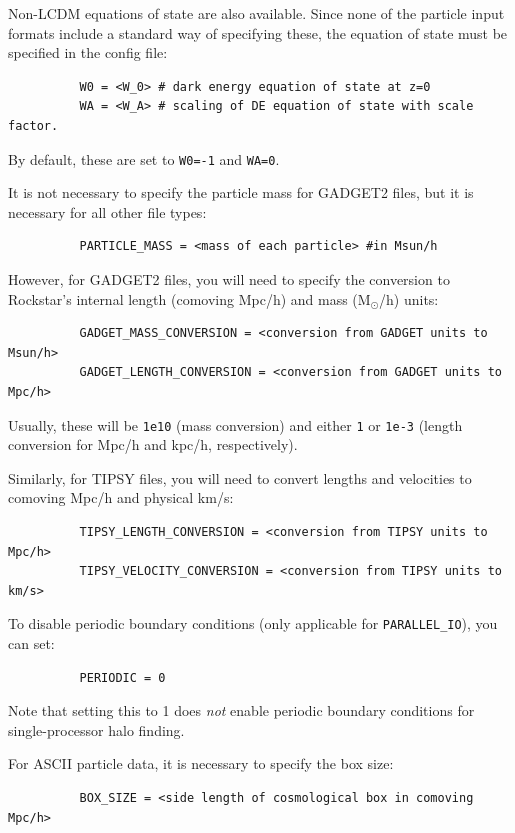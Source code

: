 \documentclass[12pt]{article}
\begin{document}
       Non-LCDM equations of state are also available.  Since none of the particle input formats include a standard way of specifying these, the equation of state must be specified in the config file:
\begin{verbatim}      
          W0 = <W_0> # dark energy equation of state at z=0
          WA = <W_A> # scaling of DE equation of state with scale factor.
\end{verbatim}
	By default, these are set to \texttt{W0=-1} and \texttt{WA=0}.

      It is not necessary to specify the particle mass for GADGET2 files, but it is necessary for all other file types:
\begin{verbatim}
          PARTICLE_MASS = <mass of each particle> #in Msun/h
\end{verbatim}

      However, for GADGET2 files, you will need to specify the conversion to
      Rockstar's internal length (comoving Mpc/h) and mass (M$_\odot$/h) units:
\begin{verbatim}
          GADGET_MASS_CONVERSION = <conversion from GADGET units to Msun/h>
          GADGET_LENGTH_CONVERSION = <conversion from GADGET units to Mpc/h>
\end{verbatim}
      Usually, these will be \texttt{1e10} (mass conversion) and either \texttt{1} or
      \texttt{1e-3} (length conversion for Mpc/h and kpc/h, respectively).

      Similarly, for TIPSY files, you will need to convert lengths and
      velocities to comoving Mpc/h and physical km/s:
\begin{verbatim}
          TIPSY_LENGTH_CONVERSION = <conversion from TIPSY units to Mpc/h>
          TIPSY_VELOCITY_CONVERSION = <conversion from TIPSY units to km/s>
\end{verbatim}
      To disable periodic boundary conditions (only applicable for \texttt{PARALLEL\_IO}),
      you can set:
\begin{verbatim}      
          PERIODIC = 0
\end{verbatim}
      Note that setting this to 1 does \textit{not} enable periodic boundary conditions
      for single-processor halo finding.

      For ASCII particle data, it is necessary to specify the box size:
\begin{verbatim}
      	  BOX_SIZE = <side length of cosmological box in comoving Mpc/h>
\end{verbatim}
\end{document}
